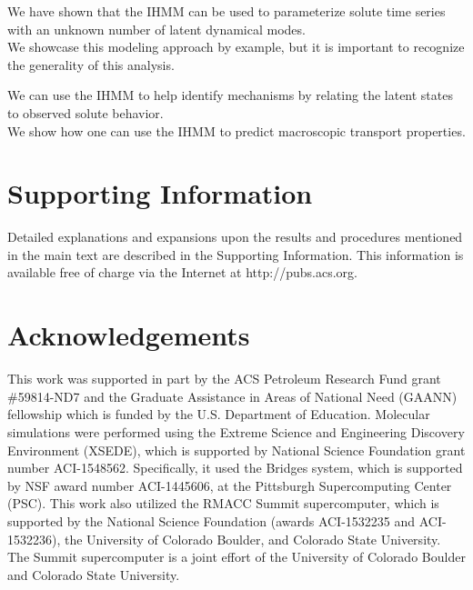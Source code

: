 \documentclass{article}
\begin{document}
  \noindent We have shown that the IHMM can be used to parameterize solute time series
  with an unknown number of latent dynamical modes. \\
  
  \noindent We showcase this modeling approach by example, but it is important to
  recognize the generality of this analysis.
  
  \noindent We can use the IHMM to help identify mechanisms by relating the latent
  states to observed solute behavior. \\
  
  \noindent We show how one can use the IHMM to predict macroscopic transport properties. \\
  
  \section*{Supporting Information}

  Detailed explanations and expansions upon the results and procedures mentioned in
  the main text are described in the Supporting Information. This information is
  available free of charge via the Internet at http://pubs.acs.org.

  \section*{Acknowledgements}

  This work was supported in part by the ACS Petroleum Research Fund
  grant \#59814-ND7 and the Graduate Assistance in Areas of National Need (GAANN) 
  fellowship which is funded by the U.S. Department of Education. 
  Molecular simulations were performed using the Extreme Science and
  Engineering Discovery Environment (XSEDE), which is supported by National
  Science Foundation grant number ACI-1548562. Specifically, it used the Bridges
  system, which is supported by NSF award number ACI-1445606, at the Pittsburgh
  Supercomputing Center (PSC). This work also utilized the RMACC Summit supercomputer,
  which is supported by the National Science Foundation (awards ACI-1532235 and
  ACI-1532236), the University of Colorado Boulder, and Colorado State
  University. The Summit supercomputer is a joint effort of the University of
  Colorado Boulder and Colorado State University.

  \clearpage

  
  


\end{document}
